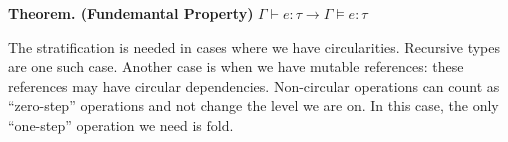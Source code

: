 \textbf{Theorem. (Fundemantal Property)} $\Gamma \vdash e : \tau \to \Gamma \models e : \tau$

The stratification is needed in cases where we have circularities. Recursive types are one such case.
Another case is when we have mutable references: these references may have circular dependencies.
Non-circular operations can count as ``zero-step'' operations and not change the level we are on.
In this case, the only ``one-step'' operation we need is $\mathrm{fold}$.

